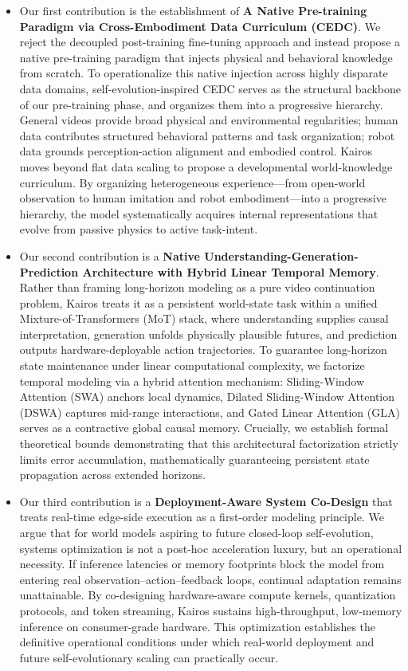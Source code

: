 \begin{itemize}
    \item 
Our first contribution is the establishment of \textbf{A Native Pre-training Paradigm via Cross-Embodiment Data Curriculum (CEDC)}. We reject the decoupled post-training fine-tuning approach and instead propose a native pre-training paradigm that injects physical and behavioral knowledge from scratch. To operationalize this native injection across highly disparate data domains, self-evolution-inspired CEDC serves as the structural backbone of our pre-training phase, and organizes them into a progressive hierarchy. General videos provide broad physical and environmental regularities; human data contributes structured behavioral patterns and task organization; robot data grounds perception-action alignment and embodied control. Kairos moves beyond flat data scaling to propose a developmental world-knowledge curriculum. By organizing heterogeneous experience—from open-world observation to human imitation and robot embodiment—into a progressive hierarchy, the model systematically acquires internal representations that evolve from passive physics to active task-intent. 


\item Our second contribution is a \textbf{Native Understanding-Generation-Prediction Architecture with Hybrid Linear Temporal Memory}. Rather than framing long-horizon modeling as a pure video continuation problem, Kairos treats it as a persistent world-state task within a unified Mixture-of-Transformers (MoT) stack, where understanding supplies causal interpretation, generation unfolds physically plausible futures, and prediction outputs hardware-deployable action trajectories. To guarantee long-horizon state maintenance under linear computational complexity, we factorize temporal modeling via a hybrid attention mechanism: Sliding-Window Attention (SWA) anchors local dynamics, Dilated Sliding-Window Attention (DSWA) captures mid-range interactions, and Gated Linear Attention (GLA) serves as a contractive global causal memory. Crucially, we establish formal theoretical bounds demonstrating that this architectural factorization strictly limits error accumulation, mathematically guaranteeing persistent state propagation across extended horizons.

\item Our third contribution is a \textbf{Deployment-Aware System Co-Design} that treats real-time edge-side execution as a first-order modeling principle. We argue that for world models aspiring to future closed-loop self-evolution, systems optimization is not a post-hoc acceleration luxury, but an operational necessity. If inference latencies or memory footprints block the model from entering real observation–action–feedback loops, continual adaptation remains unattainable. By co-designing hardware-aware compute kernels, quantization protocols, and token streaming, Kairos sustains high-throughput, low-memory inference on consumer-grade hardware. This optimization establishes the definitive operational conditions under which real-world deployment and future self-evolutionary scaling can practically occur.






\end{itemize}
